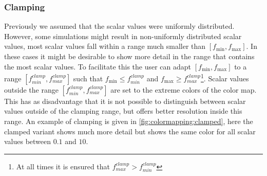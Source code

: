 \subsubsection{Clamping} %
\label{ssub:clamping}
Previously we assumed that the scalar values were uniformly distributed. However, some simulations might result in non-uniformly distributed scalar values, \eg most scalar values fall within a range much smaller than $[f_{\text{min}}, f_{\text{max}}]$. In these cases it might be desirable to show more detail in the range that contains the most scalar values. To facilitate this the user can adapt $[f_{\text{min}}, f_{\text{max}}]$ to a range $[f^{clamp}_{min}, f^{clamp}_{max}]$ such that $f_{\text{min}} \leq f^{clamp}_{min}$ and $f_{\text{max}} \geq f^{clamp}_{max}$\footnote{At all times it is ensured that $f^{clamp}_{max} > f^{clamp}_{min}$ }. Scalar values outside the range $[f^{clamp}_{min}, f^{clamp}_{max}]$ are set to the extreme colors of the color map. This has as disadvantage that it is not possible to distinguish between scalar values outside of the clamping range, but offers better resolution inside this range. An example of clamping is given in \cref{fig:colormapping:clamped}, here the clamped variant shows much more detail but shows the same color for all scalar values between $0.1$ and $10$.

